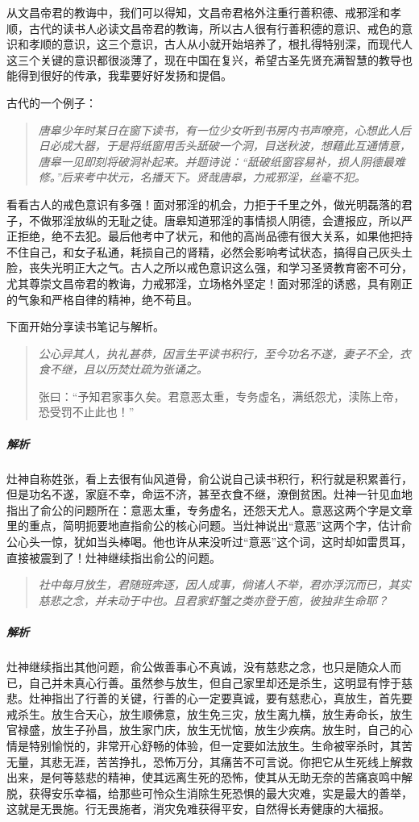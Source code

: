 从文昌帝君的教诲中，我们可以得知，文昌帝君格外注重行善积德、戒邪淫和孝顺，古代的读书人必读文昌帝君的教诲，所以古人很有行善积德的意识、戒色的意识和孝顺的意识，这三个意识，古人从小就开始培养了，根扎得特别深，而现代人这三个关键的意识都很淡薄了，现在中国在复兴，希望古圣先贤充满智慧的教导也能得到很好的传承，我辈要好好发扬和提倡。

古代的一个例子：

\begin{quote}\it
    唐皋少年时某日在窗下读书，有一位少女听到书房内书声嘹亮，心想此人后日必成大器，于是将纸窗用舌头舐破一个洞，目送秋波，想藉此互通情意，唐皋一见即刻将破洞补起来。并题诗说：“舐破纸窗容易补，损人阴德最难修。”后来考中状元，名播天下。贤哉唐皋，力戒邪淫，丝毫不犯。
\end{quote}

看看古人的戒色意识有多强！面对邪淫的机会，力拒于千里之外，做光明磊落的君子，不做邪淫放纵的无耻之徒。唐皋知道邪淫的事情损人阴德，会遭报应，所以严正拒绝，绝不去犯。最后他考中了状元，和他的高尚品德有很大关系，如果他把持不住自己，和女子私通，耗损自己的肾精，必然会影响考试状态，搞得自己灰头土脸，丧失光明正大之气。古人之所以戒色意识这么强，和学习圣贤教育密不可分，尤其尊崇文昌帝君的教诲，力戒邪淫，立场格外坚定！面对邪淫的诱惑，具有刚正的气象和严格自律的精神，绝不苟且。

下面开始分享读书笔记与解析。

\begin{quotation}\it
    公心异其人，执礼甚恭，因言生平读书积行，至今功名不遂，妻子不全，衣食不继，且以历焚灶疏为张诵之。

    张曰：“予知君家事久矣。君意恶太重，专务虚名，满纸怨尤，渎陈上帝，恐受罚不止此也！”
\end{quotation}

\subparagraph{解析} 灶神自称姓张，看上去很有仙风道骨，俞公说自己读书积行，积行就是积累善行，但是功名不遂，家庭不幸，命运不济，甚至衣食不继，潦倒贫困。灶神一针见血地指出了俞公的问题所在：意恶太重，专务虚名，还怨天尤人。意恶这两个字是文章里的重点，简明扼要地直指俞公的核心问题。当灶神说出“意恶”这两个字，估计俞公心头一惊，犹如当头棒喝。他也许从来没听过“意恶”这个词，这时却如雷贯耳，直接被震到了！灶神继续指出俞公的问题。

\begin{quote}\it
    社中每月放生，君随班奔逐，因人成事，倘诸人不举，君亦浮沉而已，其实慈悲之念，并未动于中也。且君家虾蟹之类亦登于庖，彼独非生命耶？
\end{quote}

\subparagraph{解析} 灶神继续指出其他问题，俞公做善事心不真诚，没有慈悲之念，也只是随众人而已，自己并未真心行善。虽然参与放生，但自己家里却还是杀生，这明显有悖于慈悲。灶神指出了行善的关键，行善的心一定要真诚，要有慈悲心，真放生，首先要戒杀生。放生合天心，放生顺佛意，放生免三灾，放生离九横，放生寿命长，放生官禄盛，放生子孙昌，放生家门庆，放生无忧恼，放生少疾病。放生时，自己的心情是特别愉悦的，非常开心舒畅的体验，但一定要如法放生。生命被宰杀时，其苦无量，其悲无涯，苦苦挣扎，恐怖万分，其痛苦不可言说。你把它从生死线上解救出来，是何等慈悲的精神，使其远离生死的恐怖，使其从无助无奈的苦痛哀鸣中解脱，获得安乐幸福，给那些可怜众生消除生死恐惧的最大灾难，实是最大的善举，这就是无畏施。行无畏施者，消灾免难获得平安，自然得长寿健康的大福报。

